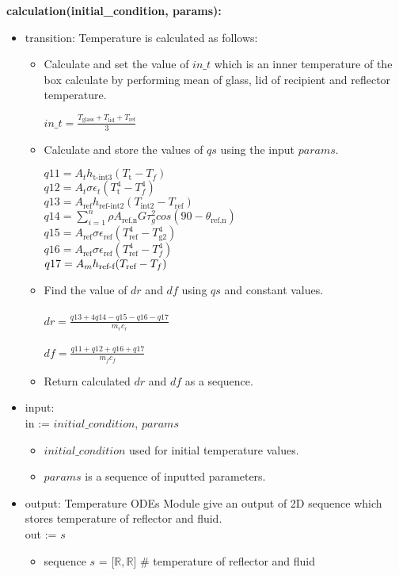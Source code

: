 \documentclass[12pt, titlepage]{article}
\begin{document}
\noindent \textbf{calculation(initial\_condition, params):}
\begin{itemize}
\item transition: Temperature is calculated as follows: 
    \begin{itemize}
        \item Calculate and set the value of $in\_t$ which is an inner temperature of the box calculate by performing mean of glass, lid of recipient and reflector temperature. 
        \begin{center}
            $in\_t = \frac{T_\text{glass} + T_\text{lid} + T_\text{ref}}{3}$
        \end{center}
        \item Calculate and store the values of $qs$ using the input $params$. 
    
            $q11 = A_t h_\text{t-int3}(T_\text{t} - T_f)$ \\ 
            $q12 = A_t \sigma \epsilon_t (T_\text{t}^4 - T_f^4)$ \\ 
            $q13 = A_\text{ref} h_\text{ref-int2}(T_\text{int2} - T_\text{ref})$ \\ 
            $q14 = \sum_{i=1}^n \rho A_\text{ref,n} G \tau_g^2 cos (90 - \theta_\text{ref,n})$ \\
            $q15 = A_\text{ref} \sigma \epsilon_\text{ref} (T^4_\text{ref} - T^4_\text{g2})$ \\
            $q16 = A_\text{ref} \sigma \epsilon_\text{ref} (T^4_\text{ref} - T^4_f)$ \\
            $q17 = A_m h_\text{\text{ref}-f}(T_\text{ref} - T_f)$ \\
            
        \item Find the value of $dr$ and $df$ using $qs$ and constant values. \\ \\ 
        $dr = \frac{q13 + 4 q14 - q15 - q16 - q17}{m_r  c_r}$ \\  \\
        $df = \frac{q11 + q12 + q16 + q17}{m_f  c_f}$
        \item Return calculated $dr$ and $df$ as a sequence. 
    \end{itemize}
\item input:  \\
in := $initial\_condition$, $params$
\begin{itemize}
    \item $initial\_condition$  used for initial temperature values. 
    \item $params$ is a sequence of inputted parameters. 
\end{itemize}
\item output: 
    Temperature ODEs Module give an output of 2D sequence which stores temperature of reflector and fluid. \\  
    out := $s$
    \begin{itemize}
        \item sequence $s$ = [$\mathbb{R}, \mathbb{R}$] \# temperature of reflector and fluid 
    \end{itemize}
    

\end{itemize}
\end{document}
